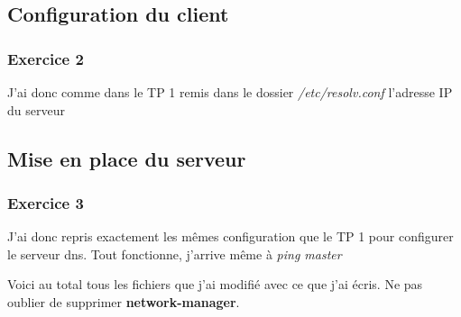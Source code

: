 \documentclass[12pt, a4paper]{article}
\begin{document}
    \subsection{Configuration du client}
        \subsubsection{Exercice 2}
        J'ai donc comme dans le TP 1 remis dans le dossier 
        \textit{/etc/resolv.conf} l'adresse IP du serveur

    \subsection{Mise en place du serveur}
        \subsubsection{Exercice 3}
        J'ai donc repris exactement les mêmes configuration que le TP 1
        pour configurer le serveur dns. Tout fonctionne, j'arrive même
        à \textit{ping master}

        Voici au total tous les fichiers que j'ai modifié avec ce que j'ai 
        écris. Ne pas oublier de supprimer \textbf{network-manager}. 
\end{document}
